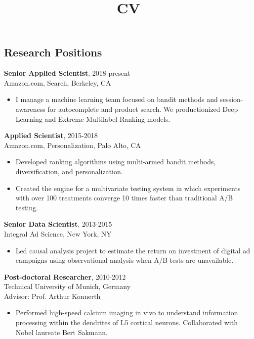\documentclass[line,11pt]{res}
\title{CV}
\begin{document}
 
\thispagestyle{empty} %
\address{246 $2^{nd}$ St. \#1401, San Francisco, CA 94105}
\address{716.771.8224}
\address{daniel.n.hill@gmail.com}
\address{www.danielnhill.com}

\begin{resume}

\section{Research Positions}
\vspace{0.1in} 

 {\bf Senior Applied Scientist}, 2018-present \\ Amazon.com, Search, Berkeley, CA 
  \begin{itemize}
          \item[] I manage a machine learning team focused on bandit methods and session-awareness for autocomplete and product search. We productionized Deep Learning and Extreme Multilabel Ranking models.
   \end{itemize}

 {\bf Applied Scientist}, 2015-2018 \\ Amazon.com, Personalization, Palo Alto, CA 
  \begin{itemize}
          \item[] Developed ranking algorithms using multi-armed bandit methods, diversification, and personalization.  
         \item[] Created the engine for a multivariate testing system in which experiments with over 100 treatments converge 10 times faster than traditional A/B testing.  
   \end{itemize}
   
 {\bf Senior Data Scientist}, 2013-2015 \\ Integral Ad Science, New York, NY 
  \begin{itemize}
          \item[] Led causal analysis project to estimate the return on investment of digital ad campaigns using observational analysis when A/B tests are unavailable.
   \end{itemize}
   
 {\bf Post-doctoral Researcher}, 2010-2012 \\ Technical University of Munich, Germany 
 \\ Advisor: Prof. Arthur Konnerth
  \begin{itemize}
        \item[] Performed high-speed calcium imaging in vivo to understand information processing within the dendrites of L5 cortical neurons.  Collaborated with Nobel laureate Bert Sakmann.
  \end{itemize}
    

\end{resume}
\end{document}
